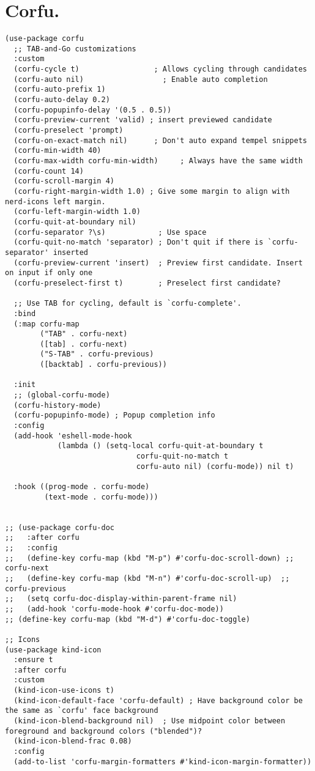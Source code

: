 \documentclass[11pt]{article}
\begin{document}
\section{Corfu.}
\label{sec:orga3c1951}
\begin{verbatim}
(use-package corfu
  ;; TAB-and-Go customizations
  :custom
  (corfu-cycle t)                 ; Allows cycling through candidates
  (corfu-auto nil)                  ; Enable auto completion
  (corfu-auto-prefix 1)
  (corfu-auto-delay 0.2)
  (corfu-popupinfo-delay '(0.5 . 0.5))
  (corfu-preview-current 'valid) ; insert previewed candidate
  (corfu-preselect 'prompt)
  (corfu-on-exact-match nil)      ; Don't auto expand tempel snippets
  (corfu-min-width 40)
  (corfu-max-width corfu-min-width)     ; Always have the same width
  (corfu-count 14)
  (corfu-scroll-margin 4)
  (corfu-right-margin-width 1.0) ; Give some margin to align with nerd-icons left margin.
  (corfu-left-margin-width 1.0)
  (corfu-quit-at-boundary nil)
  (corfu-separator ?\s)            ; Use space
  (corfu-quit-no-match 'separator) ; Don't quit if there is `corfu-separator' inserted
  (corfu-preview-current 'insert)  ; Preview first candidate. Insert on input if only one
  (corfu-preselect-first t)        ; Preselect first candidate?

  ;; Use TAB for cycling, default is `corfu-complete'.
  :bind
  (:map corfu-map
        ("TAB" . corfu-next)
        ([tab] . corfu-next)
        ("S-TAB" . corfu-previous)
        ([backtab] . corfu-previous))

  :init
  ;; (global-corfu-mode)
  (corfu-history-mode)
  (corfu-popupinfo-mode) ; Popup completion info
  :config
  (add-hook 'eshell-mode-hook
            (lambda () (setq-local corfu-quit-at-boundary t
                              corfu-quit-no-match t
                              corfu-auto nil) (corfu-mode)) nil t)

  :hook ((prog-mode . corfu-mode)
         (text-mode . corfu-mode)))


;; (use-package corfu-doc
;;   :after corfu
;;   :config
;;   (define-key corfu-map (kbd "M-p") #'corfu-doc-scroll-down) ;; corfu-next
;;   (define-key corfu-map (kbd "M-n") #'corfu-doc-scroll-up)  ;; corfu-previous
;;   (setq corfu-doc-display-within-parent-frame nil)
;;   (add-hook 'corfu-mode-hook #'corfu-doc-mode))
;; (define-key corfu-map (kbd "M-d") #'corfu-doc-toggle)

;; Icons
(use-package kind-icon
  :ensure t
  :after corfu
  :custom
  (kind-icon-use-icons t)
  (kind-icon-default-face 'corfu-default) ; Have background color be the same as `corfu' face background
  (kind-icon-blend-background nil)  ; Use midpoint color between foreground and background colors ("blended")?
  (kind-icon-blend-frac 0.08)
  :config
  (add-to-list 'corfu-margin-formatters #'kind-icon-margin-formatter))


\end{verbatim}
\end{document}
